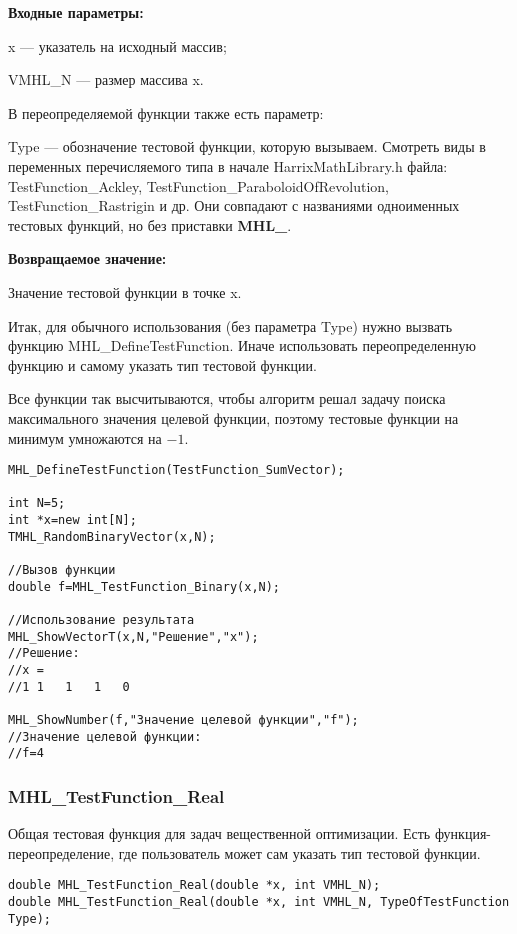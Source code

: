 \documentclass[a4paper,12pt]{article}
\begin{document}
\textbf{Входные параметры:}

x --- указатель на исходный массив;

VMHL\_N --- размер массива x.

В переопределяемой функции также есть параметр:
  
Type --- обозначение тестовой функции, которую вызываем.
Смотреть виды в переменных перечисляемого типа в начале HarrixMathLibrary.h файла: TestFunction\_Ackley, TestFunction\_ParaboloidOfRevolution, TestFunction\_Rastrigin и др. Они совпадают с названиями одноименных тестовых функций, но без приставки \textbf{MHL\_}.

\textbf{Возвращаемое значение:}
 
Значение тестовой функции в точке x.

Итак, для обычного использования (без параметра Type) нужно вызвать функцию MHL\_DefineTestFunction. Иначе использовать переопределенную функцию и самому указать тип тестовой функции.

Все функции так высчитываются, чтобы алгоритм решал задачу поиска максимального значения целевой функции, поэтому тестовые функции на минимум умножаются на $-1$.


\begin{lstlisting}[label=code_use_MHL_TestFunction_Binary,caption=Пример использования]
MHL_DefineTestFunction(TestFunction_SumVector);

int N=5;
int *x=new int[N];
TMHL_RandomBinaryVector(x,N);

//Вызов функции
double f=MHL_TestFunction_Binary(x,N);

//Использование результата
MHL_ShowVectorT(x,N,"Решение","x");
//Решение:
//x =
//1	1	1	1	0

MHL_ShowNumber(f,"Значение целевой функции","f");
//Значение целевой функции:
//f=4
\end{lstlisting}

\subsubsection{MHL\_TestFunction\_Real}\label{MHL_TestFunction_Real}

Общая тестовая функция для задач вещественной оптимизации. Есть функция-переопределение, где пользователь может сам указать тип тестовой функции.


\begin{lstlisting}[label=code_syntax_MHL_TestFunction_Real,caption=Синтаксис]
double MHL_TestFunction_Real(double *x, int VMHL_N);
double MHL_TestFunction_Real(double *x, int VMHL_N, TypeOfTestFunction Type);
\end{lstlisting}
\end{document}

